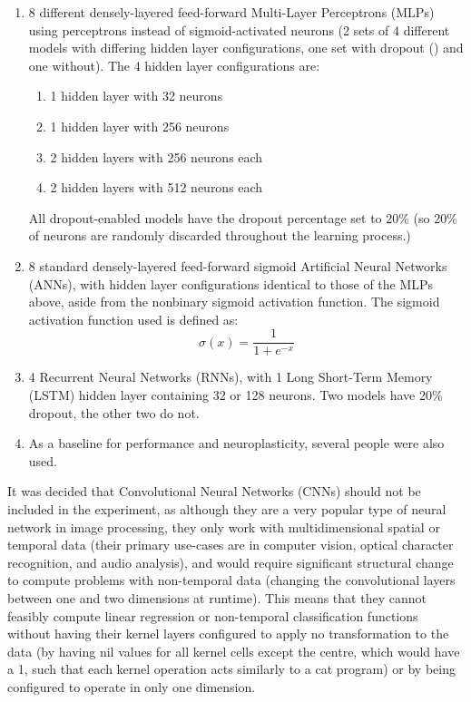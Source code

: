 \documentclass[]{report}
\begin{document}
\begin{enumerate}
	\item 8 different densely-layered feed-forward Multi-Layer Perceptrons (MLPs) using perceptrons instead of sigmoid-activated neurons (2 sets of 4 different models with differing hidden layer configurations, one set with dropout (\cite{dropout14}) and one without).
	\newline
	The 4 hidden layer configurations are:
	\begin{enumerate}
		\item 1 hidden layer with 32 neurons
		\item 1 hidden layer with 256 neurons
		\item 2 hidden layers with 256 neurons each
		\item 2 hidden layers with 512 neurons each
	\end{enumerate}
	All dropout-enabled models have the dropout percentage set to 20\% (so 20\% of neurons are randomly discarded throughout the learning process.)
	\item 8 standard densely-layered feed-forward sigmoid Artificial Neural Networks (ANNs), with hidden layer configurations identical to those of the MLPs above, aside from the nonbinary sigmoid activation function.
	\newline
	The sigmoid activation function used is defined as:
	\begin{equation}
		\sigma(x) = \frac{1}{1+e^{-x}}
	\end{equation}
	\item 4 Recurrent Neural Networks (RNNs), with 1 Long Short-Term Memory (LSTM) hidden layer containing 32 or 128 neurons. Two models have 20\% dropout, the other two do not.
	\item As a baseline for performance and neuroplasticity, several people were also used.
\end{enumerate}

It was decided that Convolutional Neural Networks (CNNs) should not be included in the experiment, as although they are a very popular type of neural network in image processing, they only work with multidimensional spatial or temporal data (their primary use-cases are in computer vision, optical character recognition, and audio analysis), and would require significant structural change to compute problems with non-temporal data (changing the convolutional layers between one and two dimensions at runtime). This means that they cannot feasibly compute linear regression or non-temporal classification functions without having their kernel layers configured to apply no transformation to the data (by having nil values for all kernel cells except the centre, which would have a 1, such that each kernel operation acts similarly to a cat program) or by being configured to operate in only one dimension.
\end{document}
